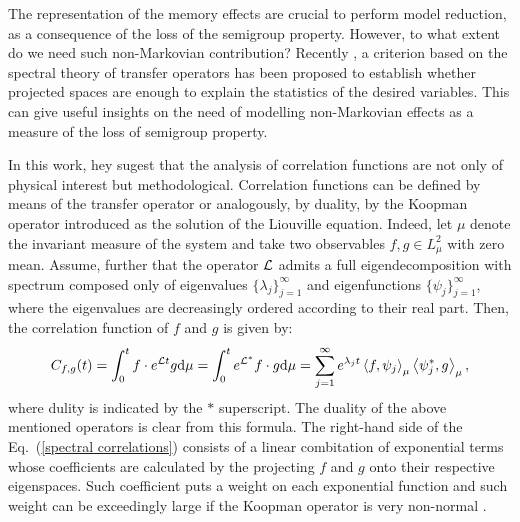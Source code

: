 \documentclass[12pt]{article}
\begin{document}
The representation of the memory effects are crucial to perform model reduction, as a consequence of the loss of the semigroup property. However, to what extent do we need such non-Markovian contribution? Recently \cite{chekroun2019c}, a criterion based on the spectral theory of transfer operators has been proposed to establish whether projected spaces are enough to explain the statistics of the desired variables. This can give useful insights on the need of modelling non-Markovian effects as a measure of the loss of semigroup property. 

In this work, hey sugest that the analysis of correlation functions are not only of physical interest but methodological. Correlation functions can be defined by means of the transfer operator or analogously, by duality, by the Koopman operator introduced as the solution of the Liouville equation. Indeed, let $\mu$ denote the invariant measure of the system and take two observables $f,g\in L^2_{\mu}$ with zero mean. Assume, further that the operator $\mathcal{L}$ admits a full eigendecomposition with spectrum composed only of eigenvalues $\{\lambda _j\}_{j=1}^{\infty}$ and eigenfunctions $\{\psi_j\}_{j=1}^{\infty}$, where the eigenvalues are decreasingly ordered according to their real part. Then, the correlation function of $f$ and $g$ is given by:
\begin{equation}\label{spectral correlations}
C_{f,g}(t) = \int _{0}^tf\cdot e^{\mathcal{L} t}g\mathrm{d} \mu = \int _{0}^te^{\mathcal{L}^{\ast}}f\cdot g \mathrm{d} \mu= \sum_{j=1}^{\infty}e^{\lambda _jt}\left \langle f,\psi_j \right \rangle _{\mu}\left \langle \psi_j^{\ast},g \right \rangle _{\mu},
\end{equation}
where dulity is indicated by the $\ast$ superscript. The duality of the above mentioned operators is clear from this formula. The right-hand side of the Eq.~(\ref{spectral correlations}) consists of a linear combitation of exponential terms whose coefficients are calculated by the projecting $f$ and $g$ onto their respective eigenspaces. Such coefficient puts a weight on each exponential function and such weight can be exceedingly large if the Koopman operator is very non-normal \cite{trefethen2005}. 
\end{document}
